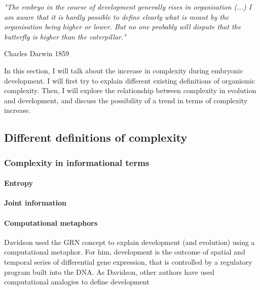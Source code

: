 \setlength{\epigraphrule}{0\p@}
\setlength{\epigraphwidth}{.7\textwidth}
\epigraph{\textit{"The embryo in the course of development generally rises in organisation (...) I am aware that it is hardly possible to define clearly what is meant by the organisation being higher or lower. But no one probably will dispute that the butterfly is higher than the caterpillar."}}{Charles Darwin 1859}

In this section, I will talk about the increase in complexity during embryonic development.
I will first try to explain different existing definitions of organismic complexity.
Then, I will explore the relationship between complexity in evolution and development, and discuss the possibility of a trend in terms of complexity increase.


\subsection{Different definitions of complexity}


\subsubsection{Complexity in informational terms}

\paragraph{Entropy}


\paragraph{Joint information}


\paragraph{Computational metaphors}

Davidson used the GRN concept to explain development (and evolution) using a computational metaphor. For him, development is the outcome of spatial and temporal series of differential gene expression, that is controlled by a regulatory program built into the DNA. As Davidson, other authors have used computational analogies to define development \citep{Apter1965,monod2012cytodifferentiation,mayr1997evolution} 

